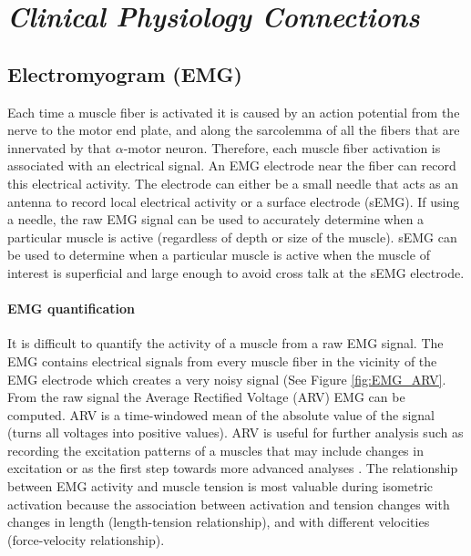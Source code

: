 \section{\textit{Clinical Physiology Connections}}

\subsection{Electromyogram (EMG)}

Each time a muscle fiber is activated it is caused by an action potential from the nerve to the motor end plate, and along the sarcolemma of all the fibers that are innervated by that $\alpha$-motor neuron. Therefore, each muscle fiber activation is associated with an electrical signal. An EMG electrode near the fiber can record this electrical activity. The electrode can either be a small needle that acts as an antenna to record local electrical activity or a surface electrode (sEMG). If using a needle, the raw EMG signal can be used to accurately determine when a particular muscle is active (regardless of depth or size of the muscle). sEMG can be used to determine when a particular muscle is active when the muscle of interest is superficial and large enough to avoid cross talk at the sEMG electrode. 

\paragraph{EMG quantification} It is difficult to quantify the activity of a muscle from a raw EMG signal. The EMG contains electrical signals from every muscle fiber in the vicinity of the EMG electrode which creates a very noisy signal (See Figure \ref{fig:EMG_ARV}. From the raw signal the Average Rectified Voltage (ARV) EMG can be computed. ARV is a time-windowed mean of the absolute value of the signal (turns all voltages into positive values). ARV is useful for further analysis such as recording the excitation patterns of a muscles that may include changes in excitation or as the first step towards more advanced analyses \cite{merletti_surface_2016}. The relationship between EMG activity and muscle tension is most valuable during isometric activation because the association between activation and tension changes with changes in length (length-tension relationship), and with different velocities (force-velocity relationship).

